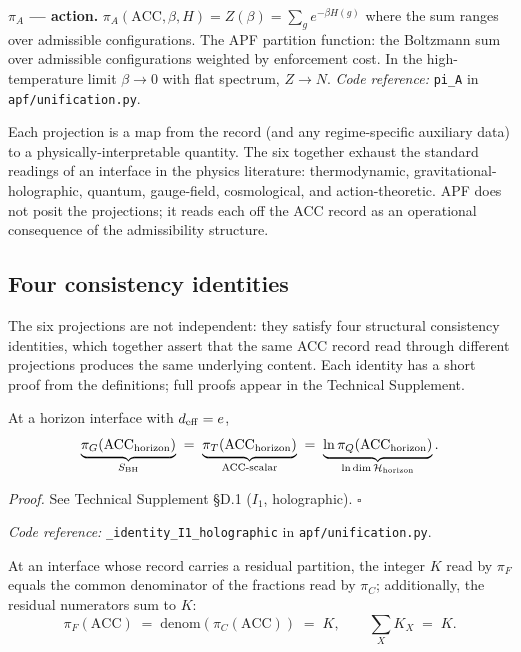 \documentclass[11pt]{article}
\newcommand{\coderef}[2]{\smallskip\noindent\textit{Code reference:} \texttt{#1} in \texttt{#2}.}
\begin{document}
\smallskip
\noindent\textbf{$\pi_A$ --- action.} $\pi_A(\mathrm{ACC}, \beta, H) = Z(\beta) = \sum_g e^{-\beta H(g)}$ where the sum ranges over admissible configurations. The APF partition function: the Boltzmann sum over admissible configurations weighted by enforcement cost. In the high-temperature limit $\beta \to 0$ with flat spectrum, $Z \to N$. \coderef{pi\_A}{apf/unification.py}

\smallskip

Each projection is a map from the record (and any regime-specific auxiliary data) to a physically-interpretable quantity. The six together exhaust the standard readings of an interface in the physics literature: thermodynamic, gravitational-holographic, quantum, gauge-field, cosmological, and action-theoretic. APF does not posit the projections; it reads each off the ACC record as an operational consequence of the admissibility structure.

\subsection{Four consistency identities}\label{sec:ledger_identities}

The six projections are not independent: they satisfy four structural consistency identities, which together assert that the same ACC record read through different projections produces the same underlying content. Each identity has a short proof from the definitions; full proofs appear in the Technical Supplement.

\begin{tcolorbox}[apfbox, title={Identity $I_1$ (Holographic)}]
At a horizon interface with $d_{\rm eff} = e$,
\[
\underbrace{\pi_G(\mathrm{ACC}_{\rm horizon})}_{S_{\rm BH}} \;=\; \underbrace{\pi_T(\mathrm{ACC}_{\rm horizon})}_{\mathrm{ACC}\text{-scalar}} \;=\; \underbrace{\ln\pi_Q(\mathrm{ACC}_{\rm horizon})}_{\ln\dim\mathcal{H}_{\rm horizon}}.
\]
\end{tcolorbox}

\noindent\textit{Proof.} See Technical Supplement \S D.1 ($I_1$, holographic). \hfill$\square$

\smallskip

\coderef{\_identity\_I1\_holographic}{apf/unification.py}

\begin{tcolorbox}[apfbox, title={Identity $I_2$ (Gauge--Cosmological)}]
At an interface whose record carries a residual partition, the integer $K$ read by $\pi_F$ equals the common denominator of the fractions read by $\pi_C$; additionally, the residual numerators sum to $K$:
\[
\pi_F(\mathrm{ACC}) \;=\; \mathrm{denom}(\pi_C(\mathrm{ACC})) \;=\; K, \qquad \sum_X K_X \;=\; K.
\]
\end{tcolorbox}
\end{document}
